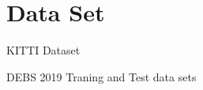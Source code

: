 \section{Data Set}



% 



% 










KITTI Dataset \cite{Geiger2013IJRR}

DEBS 2019 Traning and Test data sets \cite{DEBSGC2019}


